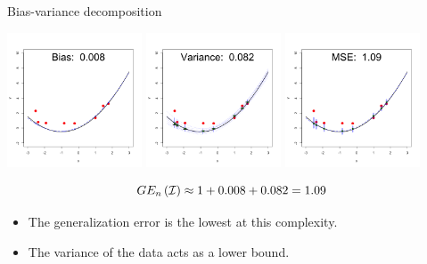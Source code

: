 \documentclass[11pt,compress,t,notes=noshow, xcolor=table]{beamer}
\begin{document}
\begin{vbframe} {Bias-variance decomposition}
\framebreak

\begin{center}
  \includegraphics[width = 0.3\textwidth]{figure/bias_variance_decomposition-correct_model_bias.png}
  \includegraphics[width = 0.3\textwidth]{figure/bias_variance_decomposition-correct_model_variance.png}
  \includegraphics[width = 0.3\textwidth]{figure/bias_variance_decomposition-correct_model_mse.png}
\end{center}

$$GE_n\left(\mathcal{I}\right) \approx 1 + 0.008 + 0.082 = 1.09 $$

\begin{itemize}
  \item The generalization error is the lowest at this complexity.
  \item The variance of the data acts as a lower bound.
\end{itemize}
 

\end{vbframe}
\end{document}
